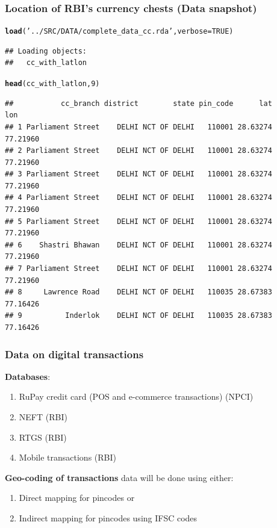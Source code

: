 \documentclass{beamer}\usepackage[]{graphicx}\usepackage[]{color}
\makeatletter
\newcommand{\hlnum}[1]{\textcolor[rgb]{0.686,0.059,0.569}{#1}}%
\newcommand{\hlstr}[1]{\textcolor[rgb]{0.192,0.494,0.8}{#1}}%
\newcommand{\hlstd}[1]{\textcolor[rgb]{0.345,0.345,0.345}{#1}}%
\newcommand{\hlkwc}[1]{\textcolor[rgb]{0.333,0.667,0.333}{#1}}%
\newcommand{\hlkwd}[1]{\textcolor[rgb]{0.737,0.353,0.396}{\textbf{#1}}}%
\newenvironment{kframe}{%
 \def\at@end@of@kframe{}%
 \ifinner\ifhmode%
  \def\at@end@of@kframe{\end{minipage}}%
  \begin{minipage}{\columnwidth}%
 \fi\fi%
 \def\FrameCommand##1{\hskip\@totalleftmargin \hskip-\fboxsep
 \colorbox{shadecolor}{##1}\hskip-\fboxsep
     \hskip-\linewidth \hskip-\@totalleftmargin \hskip\columnwidth}%
 \MakeFramed {\advance\hsize-\width
   \@totalleftmargin\z@ \linewidth\hsize
   \@setminipage}}%
 {\par\unskip\endMakeFramed%
 \at@end@of@kframe}
\newenvironment{knitrout}{}{} %
\makeatother
\begin{document}
\begin{frame}[fragile]
  \frametitle{Location of RBI's currency chests (Data snapshot)}
  \begin{footnotesize}

    
\begin{knitrout}
\color{fgcolor}\begin{kframe}
\begin{alltt}
\hlkwd{load}\hlstd{(}\hlstr{'../SRC/DATA/complete_data_cc.rda'}\hlstd{,} \hlkwc{verbose} \hlstd{=} \hlnum{TRUE}\hlstd{)}
\end{alltt}
\begin{verbatim}
## Loading objects:
##   cc_with_latlon
\end{verbatim}
\begin{alltt}
\hlkwd{head}\hlstd{(cc_with_latlon,} \hlnum{9}\hlstd{)}
\end{alltt}
\begin{verbatim}
##           cc_branch district        state pin_code      lat      lon
## 1 Parliament Street    DELHI NCT OF DELHI   110001 28.63274 77.21960
## 2 Parliament Street    DELHI NCT OF DELHI   110001 28.63274 77.21960
## 3 Parliament Street    DELHI NCT OF DELHI   110001 28.63274 77.21960
## 4 Parliament Street    DELHI NCT OF DELHI   110001 28.63274 77.21960
## 5 Parliament Street    DELHI NCT OF DELHI   110001 28.63274 77.21960
## 6    Shastri Bhawan    DELHI NCT OF DELHI   110001 28.63274 77.21960
## 7 Parliament Street    DELHI NCT OF DELHI   110001 28.63274 77.21960
## 8     Lawrence Road    DELHI NCT OF DELHI   110035 28.67383 77.16426
## 9          Inderlok    DELHI NCT OF DELHI   110035 28.67383 77.16426
\end{verbatim}
\end{kframe}
\end{knitrout}
  \end{footnotesize}
\end{frame}

\begin{frame}
  \frametitle{Data on digital transactions}
  \begin{footnotesize}
    \textbf{Databases}:
    \begin{enumerate}
    \item RuPay credit card (POS and e-commerce transactions) (NPCI)
    \item NEFT (RBI)
    \item RTGS (RBI)
    \item Mobile transactions (RBI)
    \end{enumerate}
    \vspace{7mm}
    \textbf{Geo-coding of transactions} data will be done using either:
    \begin{enumerate}
    \item Direct mapping for pincodes or
    \item Indirect mapping for pincodes using IFSC codes
    \end{enumerate}
  \end{footnotesize}
\end{frame}
\end{document}
